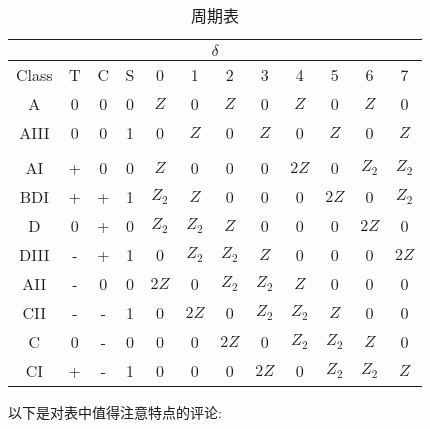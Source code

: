 \documentclass[a4paper]{article}
\numberwithin{equation}{subsection}
\begin{document}
\begin{table}[h]
    \centering
    \begin{tabular}{|c|c|c|c|c|c|c|c|c|c|c|c|}
    \hline
    \multicolumn{12}{|c|}{$\delta$}                                                   \\ \hline
    Class & T & C & S & 0     & 1     & 2     & 3     & 4     & 5     & 6     & 7     \\ \hline
    A     & 0 & 0 & 0 & $Z$   & 0     & $Z$   & 0     & $Z$   & 0     & $Z$   & 0     \\ \hline
    AIII  & 0 & 0 & 1 & 0     & $Z$   & 0     & $Z$   & 0     & $Z$   & 0     & $Z$   \\ \hline
    \\ \hline
    AI    & + & 0 & 0 & $Z$   & 0     & 0     & 0     & $2Z$  & 0     & $Z_2$ & $Z_2$ \\ \hline
    BDI   & + & + & 1 & $Z_2$ & $Z$   & 0     & 0     & 0     & $2Z$  & 0     & $Z_2$ \\ \hline
    D     & 0 & + & 0 & $Z_2$ & $Z_2$ & $Z$   & 0     & 0     & 0     & $2Z$  & 0     \\ \hline
    DIII  & - & + & 1 & 0     & $Z_2$ & $Z_2$ & $Z$   & 0     & 0     & 0     & $2Z$  \\ \hline
    AII   & - & 0 & 0 & $2Z$  & 0     & $Z_2$ & $Z_2$ & $Z$   & 0     & 0     & 0     \\ \hline
    CII   & - & - & 1 & 0     & $2Z$  & 0     & $Z_2$ & $Z_2$ & $Z$   & 0     & 0     \\ \hline
    C     & 0 & - & 0 & 0     & 0     & $2Z$  & 0     & $Z_2$ & $Z_2$ & $Z$   & 0     \\ \hline
    CI    & + & - & 1 & 0     & 0     & 0     & $2Z$  & 0     & $Z_2$ & $Z_2$ & $Z$   \\ \hline
    \end{tabular}
    \caption{周期表}
\end{table}
以下是对表中值得注意特点的评论:
\end{document}
